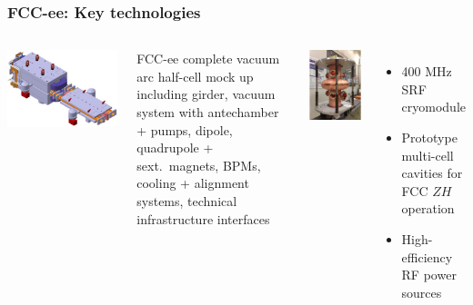 \documentclass[aspectratio=169]{beamer}
\begin{document}
\begin{frame}
  \frametitle{FCC-ee: Key technologies}
  \begin{columns}[c]

    \begin{center}
      \includegraphics[width=0.6\linewidth]{figures/vacuumArc.png}\\
    \end{center}

    FCC-ee complete vacuum arc half-cell mock up\\[1ex]
    \small{%
    including girder, vacuum system with antechamber + pumps,
    dipole, quadrupole + sext.\ magnets, BPMs, cooling + alignment
    systems, technical infrastructure interfaces}
    \pause%


    \begin{center}
      \includegraphics[width=0.35\linewidth]{figures/srfCavities.png}\\
    \end{center}

    \begin{itemize}
      \item 400 MHz SRF cryomodule
      \item Prototype multi-cell cavities for FCC $ZH$ operation
      \item High-efficiency RF power sources
    \end{itemize}
  \end{columns}
\end{frame}
\end{document}
